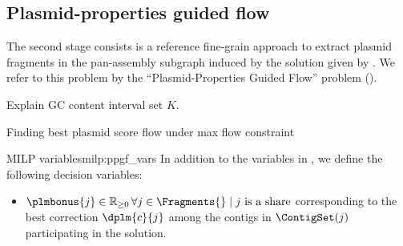 \subsection{Plasmid-properties guided flow}\label{meth:plasmid_properties_guided_flow}

The second stage consists is a reference fine-grain approach to extract plasmid fragments in the pan-assembly subgraph induced by the solution given by \MCF{}.
We refer to this problem by the \enquote{Plasmid-Properties Guided Flow} problem (\PPGF{}).

\begin{todobox}
    Explain GC content interval set \(K\).
\end{todobox}

\begin{todobox}
    Finding best plasmid score flow under max flow constraint
\end{todobox}

\begin{definition}{\PPGF{} MILP variables}{milp:ppgf_vars}
    In addition to the variables in , we define the following decision variables:
    \begin{itemize}
        \item \(\plmbonus{j} \in \mathbb{R}_{\geq 0} \, \forall j \in \Fragments{} \mid j \text{ is a share}\) corresponding to the best correction \(\dplm{c}{j}\) among the contigs in \(\ContigSet(j)\) participating in the solution.
    \end{itemize}
\end{definition}

